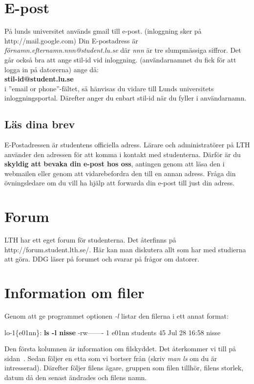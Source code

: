 \documentclass[a4paper,twocolumn]{book}
\begin{document}
\section{E-post}
På lunds universitet används gmail till e-post. (inloggning sker på http://mail.google.com)
Din E-postadress är \emph{förnamn.efternamn.nnn@student.lu.se} där \emph{nnn}
är tre slumpmässiga siffror.
Det går också bra att ange stil-id vid inloggning. (användarnamnet du fick för att logga in på datorerna)
ange då: \\ \textbf{stil-id@student.lu.se} \\
i ''email or phone''-fältet, så hänvisas du vidare till Lunds universitets
inloggningsportal. Därefter anger du enbart stil-id när du fyller i användarnamn.

\subsection{Läs dina brev}

E-Postadressen är studentens officiella adress. Lärare och administratörer
på LTH använder den adressen för att komma i kontakt med studenterna.
Därför är du \textbf{skyldig att bevaka din e-post hos oss}, antingen
genom att läsa den i webmailen eller genom att vidarebefordra den till en
annan adress. Fråga din övningsledare om du vill ha hjälp att forwarda din e-post till just din adress.

\section{Forum}

LTH har ett eget forum för studenterna. Det återfinns på
http://forum.student.lth.se/. Här kan man diskutera allt som har med studierna
att göra. DDG läser på forumet och svarar på frågor om datorer.

\section{Information om filer}

Genom att ge programmet  optionen
\emph{-l} listar den filerna i ett annat format:
\begin{example}
\scriptsize
lo-1\{e01nn\}: \textbf{ls -l nisse}
-rw-------   1 e01nn  students  45  Jul 28 16:58 nisse
\end{example}
Den första kolumnen är information om filskyddet. Det återkommer vi
till på sidan~\pageref{sec:filskydd}. Sedan följer en etta som vi
bortser från (skriv \emph{man ls} om du är intresserad). Därefter
följer filens ägare, gruppen som filen tillhör, filens storlek, datum
då den senast ändrades och filens namn.
\end{document}
